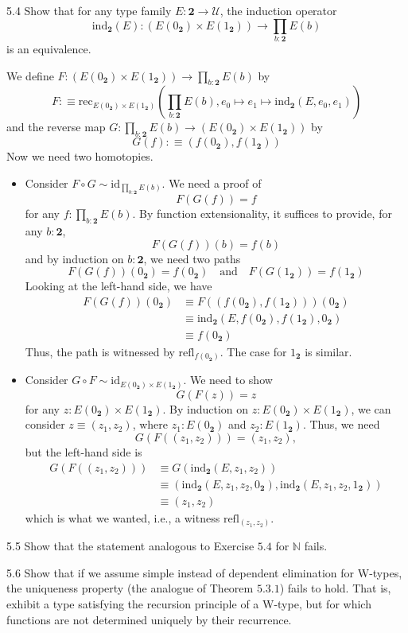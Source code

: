 \documentclass[14pt]{extarticle}
\newcommand{\N}{{\mathbb N}}
\newcommand{\0}{{\mathbf 0}}
\newcommand{\1}{{\mathbf 1}}
\newcommand{\2}{{\mathbf 2}}
\newcommand{\UU}{{\mathcal U}}
\newcommand{\mt}{\mapsto}
\newcommand{\rec}{\mathrm{rec}}
\newcommand{\ind}{\mathrm{ind}}
\newcommand{\refl}{\mathrm{refl}}
\newcommand{\id}{\mathrm{id}}
\begin{document}
\begin{prob}{5.4}{} Show that for any type family $E : \2 \to \UU$, the induction operator \[\ind_\2(E) : (E(0_\2) \times E(1_\2)) \to \prod_{b : \2} E(b)\] is an equivalence.
\end{prob}
We define $F : (E(0_\2) \times E(1_\2)) \to \prod_{b : \2} E(b)$ by 
\[F :\equiv \rec_{E(0_\2) \times E(1_\2)}\left(\prod_{b:\2}E(b), e_0 \mt e_1 \mt \ind_\2(E, e_0,e_1)\right)\] and the reverse map $G : \prod_{b : \2} E(b) \to (E(0_\2) \times E(1_\2))$ by \[G(f) :\equiv (f(0_\2), f(1_\2))\]
Now we need two homotopies.
\begin{itemize}
\item Consider $F \circ G \sim \id_{\prod_{b : \2} E(b)}$. We need a proof of
\[F(G(f)) = f\] for any $f : \prod_{b : \2} E(b)$. By function extensionality, it suffices to provide, for any $b : \2$,
\[F(G(f))(b) = f(b)\] and by induction on $b : \2$, we need two paths
\[F(G(f))(0_\2) = f(0_\2) \quad \text{and} \quad F(G(1_\2)) = f(1_\2)\]
Looking at the left-hand side, we have
\begin{align*}
F(G(f))(0_\2) &\equiv F((f(0_\2), f(1_\2)))(0_\2) \\
&\equiv \ind_\2(E,f(0_\2), f(1_\2), 0_\2) \\
&\equiv f(0_\2)
\end{align*}
Thus, the path is witnessed by $\refl_{f(0_\2)}$. The case for $1_\2$ is similar.

\item Consider $G \circ F \sim \id_{E(0_\2) \times E(1_\2)}$. We need to show
\[G(F(z)) = z\] for any $z : E(0_\2) \times E(1_\2)$. By induction on $z : E(0_\2) \times E(1_\2)$, we can consider $z \equiv (z_1,z_2)$, where $z_1 : E(0_\2)$ and $z_2 : E(1_\2)$. Thus, we need
\[G(F((z_1,z_2))) = (z_1,z_2),\] but the left-hand side is
\begin{align*}
G(F((z_1,z_2))) &\equiv G(\ind_\2(E,z_1,z_2)) \\
&\equiv (\ind_\2(E,z_1,z_2,0_\2), \ind_\2(E,z_1,z_2,1_\2)) \\
&\equiv (z_1,z_2)
\end{align*}
which is what we wanted, i.e., a witness $\refl_{(z_1,z_2)}$.
\end{itemize}

\begin{prob}{5.5}{} Show that the statement analogous to Exercise $5.4$ for $\N$ fails.
\end{prob}

\begin{prob}{5.6}{} Show that if we assume simple instead of dependent elimination for W-types, the uniqueness property (the analogue of Theorem $5.3.1$) fails to hold. That is, exhibit a type satisfying the recursion principle of a W-type, but for which functions are not determined uniquely by their recurrence.
\end{prob}
\end{document}
